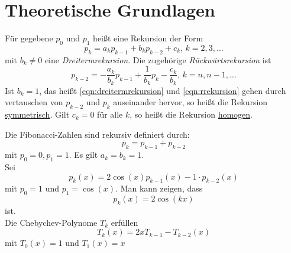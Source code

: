 \section{Theoretische Grundlagen}
\begin{definition}
Für gegebene $p_0$ und $p_1$ heißt eine Rekursion der Form
\begin{equation}
	\label{eqn:dreitermrekursion}
	p_k=a_kp_{k-1}+b_kp_{k-2}+c_k\text{, } k=2,3,\ldots
\end{equation}
mit $b_k\neq 0$ eine \emph{Dreitermrekursion}. Die zugehörige \emph{Rückwärtsrekursion} ist
\begin{equation}
	\label{eqn:rrekursion}
p_{k-2}= -\frac{a_k}{b_k}p_{k-1}+\frac{1}{b_k}p_k-\frac{c_k}{b_k}\text{, } k=n,n-1,\ldots
\end{equation}
Ist $b_k=1$, das heißt \eqref{eqn:dreitermrekursion} und \eqref{eqn:rrekursion} gehen durch vertauschen von $p_{k-2}$ und $p_k$ auseinander hervor, so heißt die Rekursion \underline{symmetrisch}. Gilt $c_k=0$ für alle $k$, so heißt die Rekursion \underline{homogen}.
\end{definition}
\begin{example}
Die Fibonacci-Zahlen sind rekursiv definiert durch:
\[
p_k=p_{k-1}+p_{k-2}
\]
mit $p_0=0, p_1=1$. Es gilt $a_k=b_k=1$. \\
Sei
\[
p_k(x)= 2\cos(x)p_{k-1}(x) -1 \cdot p_{k-2}(x)
\]
mit $p_0=1$ und $p_1=\cos(x)$. Man kann zeigen, dass
\[
p_k(x)=2\cos(kx)
\]
ist. \\
Die Chebychev-Polynome $T_k$ erfüllen 
\[
T_k(x)=2x T_{k-1} -T_{k-2}(x)
\]
mit $T_0(x)=1$ und $T_1(x)=x$
\end{example}

